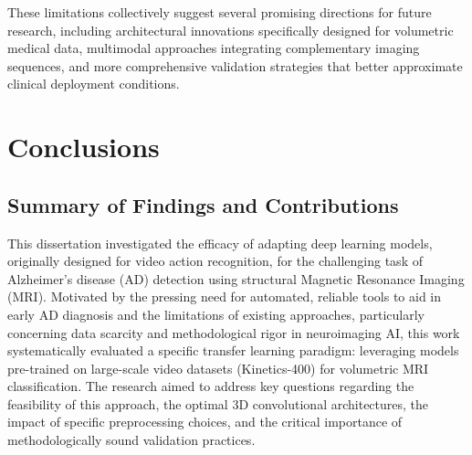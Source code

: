 \documentclass[11pt, a4paper]{article}
\begin{document}
    
    
    

These limitations collectively suggest several promising directions for future research, including architectural innovations specifically designed for volumetric medical data, multimodal approaches integrating complementary imaging sequences, and more comprehensive validation strategies that better approximate clinical deployment conditions.

\section{Conclusions}
\label{sec:conclusions}

\subsection{Summary of Findings and Contributions}

This dissertation investigated the efficacy of adapting deep learning models, originally designed for video action recognition, for the challenging task of Alzheimer's disease (AD) detection using structural Magnetic Resonance Imaging (MRI). Motivated by the pressing need for automated, reliable tools to aid in early AD diagnosis and the limitations of existing approaches, particularly concerning data scarcity and methodological rigor in neuroimaging AI, this work systematically evaluated a specific transfer learning paradigm: leveraging models pre-trained on large-scale video datasets (Kinetics-400) for volumetric MRI classification. The research aimed to address key questions regarding the feasibility of this approach, the optimal 3D convolutional architectures, the impact of specific preprocessing choices, and the critical importance of methodologically sound validation practices.
\end{document}
